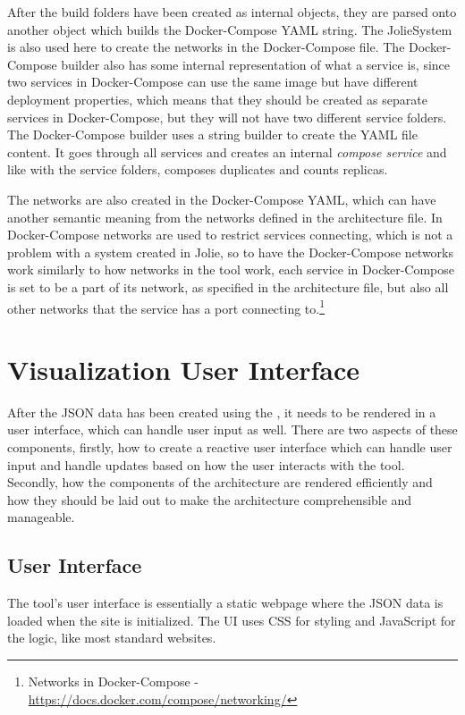After the build folders have been created as internal objects, they are parsed onto another object which builds the Docker-Compose YAML string. The JolieSystem is also used here to create the networks in the Docker-Compose file.
The Docker-Compose builder also has some internal representation of what a service is, since two services in Docker-Compose can use the same image but have different deployment properties, which means that they should be created as separate services in Docker-Compose, but they will not have two different service folders.
The Docker-Compose builder uses a string builder to create the YAML file content. It goes through all services and creates an internal \textit{compose service} and like with the service folders, composes duplicates and counts replicas.

The networks are also created in the Docker-Compose YAML, which can have another semantic meaning from the networks defined in the architecture file.
In Docker-Compose networks are used to restrict services connecting, which is not a problem with a system created in Jolie, so to have the Docker-Compose networks work similarly to how networks in the tool work, each service in Docker-Compose is set to be a part of
its network, as specified in the architecture file, but also all other networks that the service has a port connecting to.\footnote{Networks in Docker-Compose - \url{https://docs.docker.com/compose/networking/}}

\section{Visualization User Interface}
After the JSON data has been created using the \javatoolname[], it needs to be rendered in a user interface, which can handle user input as well.
There are two aspects of these components, firstly, how to create a reactive user interface which can handle user input and handle updates based on how the user interacts with the tool. Secondly, how the components of the architecture are rendered efficiently and how they should be laid out to make the architecture comprehensible and manageable.

\subsection{User Interface}
The tool's user interface is essentially a static webpage where the JSON data is loaded when the site is initialized.
The UI uses CSS for styling and JavaScript for the logic, like most standard websites.

